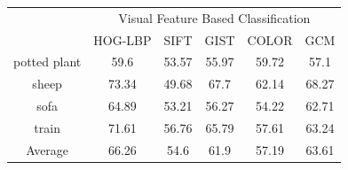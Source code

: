 \begin{table}[!ht]
  \begin{tabular}{| c | c | c | c | c | c |}
\hline
 {\multirow{2}{*}{Labels}} & \multicolumn{5}{|c|}{Visual Feature Based Classification} \\
 \cline{2-6}
  & HOG-LBP & SIFT & GIST & COLOR & GCM \\  [1ex] \hline
potted plant & 59.6 & 53.57 & 55.97 & 59.72 & 57.1 \\  [1ex] \hline
sheep & 73.34 & 49.68 & 67.7 & 62.14 & 68.27 \\  [1ex] \hline
sofa & 64.89 & 53.21 & 56.27 & 54.22 & 62.71 \\  [1ex] \hline
train & 71.61 & 56.76 & 65.79 & 57.61 & 63.24 \\  [1ex] \hline
Average & 66.26 & 54.6 & 61.9 & 57.19 & 63.61 \\  [1ex] \hline
\end{tabular}
\label{PASCALPrecisionVisual} %
\end{table}

